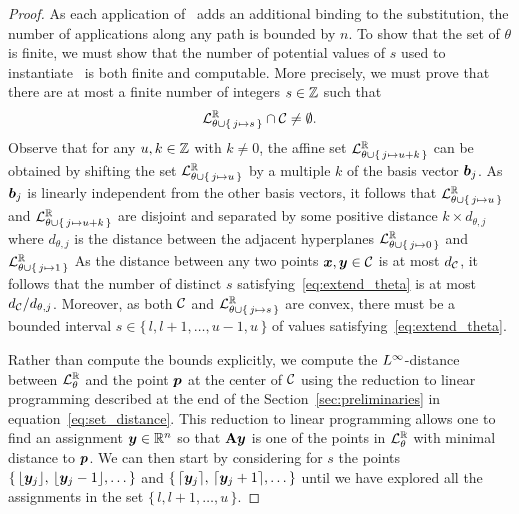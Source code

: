 \begin{proof}
As each application of~ adds an additional
binding to the substitution, the number of applications along any
path is bounded by $n$.  To show that the set of $\theta$ is finite,
we must show that the number of potential values of $s$ used to
instantiate~ is both finite and computable.
More precisely, we must prove that
there are at most a finite number of integers $s \in \mathbb{Z}$ such that
\begin{equation}
\mathcal{L}^{\mathbb{R}}_{\theta \cup \{\,j \mapsto s\,\}} \cap \mathcal{C} \neq \emptyset.
\label{eq:extend_theta}
\end{equation}
%
Observe that for any $u,k \in \mathbb{Z}$ with $k \neq 0$, the affine set
$\mathcal{L}^{\mathbb{R}}_{\theta \cup \{\,j \mapsto u+k\,\}}$ can be
obtained by shifting the set $\mathcal{L}^{\mathbb{R}}_{\theta \cup \{\,j \mapsto u\,\}}$
by a multiple $k$ of the basis vector $\boldsymbol{b}_j$.  As $\boldsymbol{b}_j$ is linearly
independent from the other basis vectors, it follows that
$\mathcal{L}^{\mathbb{R}}_{\theta \cup \{\,j \mapsto u\,\}}$ and
$\mathcal{L}^{\mathbb{R}}_{\theta \cup \{\,j \mapsto u+k\,\}}$
are disjoint and separated by some
positive distance $k \times d_{\theta,j}$ where $d_{\theta,j}$ is the distance
between the adjacent hyperplanes $\mathcal{L}^{\mathbb{R}}_{\theta \cup \{\,j \mapsto 0\,\}}$ and
$\mathcal{L}^{\mathbb{R}}_{\theta \cup \{\,j \mapsto 1\,\}}$
%
As the distance between any two points $\boldsymbol{x}, \boldsymbol{y} \in \mathcal{C}$ is at most
$d_{\mathcal{C}}$, it follows that the number of distinct $s$
satisfying~\eqref{eq:extend_theta} is at most
$d_{\mathcal{C}} / d_{\theta,j}$.  Moreover, as both $\mathcal{C}$ and
$\mathcal{L}^{\mathbb{R}}_{\theta \cup \{\,j \mapsto s\,\}}$ are convex, there
must be a bounded interval $s \in \{\,l,l+1,\dots, u-1, u\,\}$
of values satisfying~\eqref{eq:extend_theta}.

Rather than compute the bounds explicitly, we
compute the $L^\infty$-distance between $\mathcal{L}^{\mathbb{R}}_\theta$ and the point $\boldsymbol{p}$ at
the center of $\mathcal{C}$ using the reduction to linear programming described at the
end of the Section~\ref{sec:preliminaries} in equation~\eqref{eq:set_distance}.
%
This reduction to linear programming allows one to find an assignment
$\boldsymbol{y} \in \mathbb{R}^{n}$ so that $\mathbf{A} \boldsymbol{y}$ is one of the points
in $\mathcal{L}^{\mathbb{R}}_\theta$ with minimal distance to $\boldsymbol{p}$.  We can then start by
considering for $s$ the points $\{\,\lfloor \boldsymbol{y}_j \rfloor,\,\lfloor \boldsymbol{y}_j-1 \rfloor,\dots\,\}$
and $\{\,\lceil \boldsymbol{y}_j \rceil,\,\lceil \boldsymbol{y}_j+1 \rceil,\dots\,\}$ until we have
explored all the assignments in the set $\{\,l,l+1,\dots, u\,\}$.
%
\end{proof}

%
%

